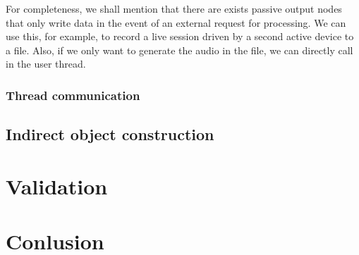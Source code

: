 For completeness, we shall mention that there are exists passive
output nodes that only write data in the event of an external
request for processing. We can use this, for example, to record a live
session driven by a second active device to a file. Also, if we only
want to generate the audio in the file, we can directly call
 in the user thread.

\subsubsection{Thread communication}

\subsection{Indirect object construction}

\label{sec:graphfactory}


\label{sec:modports}

\section{Validation}

\section{Conlusion}


